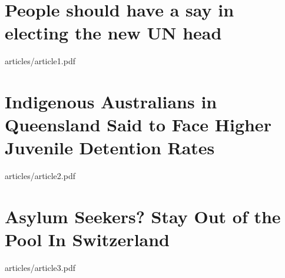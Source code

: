 \section{People should have a say in electing the new UN head}


	{articles/article1.pdf}

\section{Indigenous Australians in Queensland Said to Face Higher Juvenile Detention Rates}


	{articles/article2.pdf}

\section{Asylum Seekers? Stay Out of the Pool In Switzerland}


	{articles/article3.pdf}


